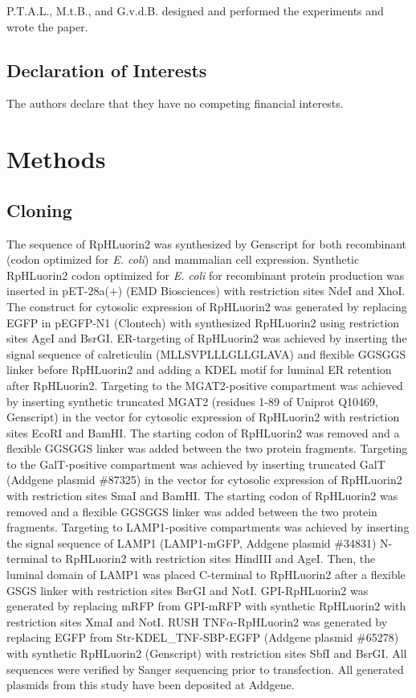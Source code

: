 P.T.A.L., M.t.B., and G.v.d.B. designed and performed the experiments and wrote the paper.

\subsection{Declaration of Interests}

The authors declare that they have no competing financial interests.

\clearpage

\section{Methods}

\subsection{Cloning}

The sequence of RpHLuorin2\cite{mahon_phluorin2:_2011} was synthesized by Genscript for both recombinant (codon optimized for \emph{E. coli}) and mammalian cell expression. Synthetic RpHLuorin2 codon optimized for \emph{E. coli} for recombinant protein production was inserted in pET-28a(+) (EMD Biosciences) with restriction sites NdeI and XhoI. The construct for cytosolic expression of RpHLuorin2 was generated by replacing EGFP in pEGFP-N1 (Clontech) with synthesized RpHLuorin2 using restriction sites AgeI and BsrGI. ER-targeting of RpHLuorin2 was achieved by inserting the signal sequence of calreticulin (MLLSVPLLLGLLGLAVA) and flexible GGSGGS linker before RpHLuorin2 and adding a KDEL motif for luminal ER retention after RpHLuorin2. Targeting to the MGAT2-positive compartment was achieved by inserting synthetic truncated MGAT2 (residues 1-89 of Uniprot Q10469, Genscript) in the vector for cytosolic expression of RpHLuorin2 with restriction sites EcoRI and BamHI. The starting codon of RpHLuorin2 was removed and a flexible GGSGGS linker was added between the two protein fragments. Targeting to the GalT-positive compartment was achieved by inserting truncated GalT (Addgene plasmid \#87325) in the vector for cytosolic expression of RpHLuorin2 with restriction sites SmaI and BamHI. The starting codon of RpHLuorin2 was removed and a flexible GGSGGS linker was added between the two protein fragments. Targeting to LAMP1-positive compartments was achieved by inserting the signal sequence of LAMP1 (LAMP1-mGFP\cite{falcon-perez_distribution_2005}, Addgene plasmid \#34831) N-terminal to RpHLuorin2 with restriction sites HindIII and AgeI. Then, the luminal domain of LAMP1 was placed C-terminal to RpHLuorin2 after a flexible GSGS linker with restriction sites BsrGI and NotI. GPI-RpHLuorin2 was generated by replacing mRFP from GPI-mRFP with synthetic RpHLuorin2 with restriction sites XmaI and NotI. RUSH TNF$\alpha$-RpHLuorin2 was generated by replacing EGFP from Str-KDEL\_TNF-SBP-EGFP (Addgene plasmid \#65278) with synthetic RpHLuorin2 (Genscript) with restriction sites SbfI and BsrGI. All sequences were verified by Sanger sequencing prior to transfection. All generated plasmids from this study have been deposited at Addgene.

